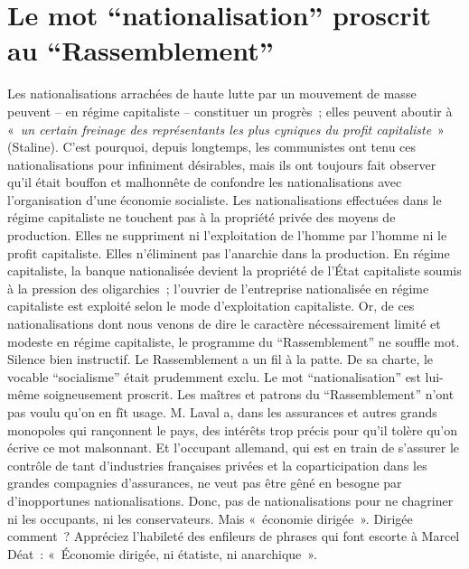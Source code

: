 \documentclass[french,twoside]{book} %
\begin{document}
\section[Le mot “nationalisation” proscrit au “Rassemblement”]{Le mot “nationalisation” proscrit au “Rassemblement”}
\noindent Les nationalisations arrachées de haute lutte par un mouvement de masse peuvent – en régime capitaliste – constituer un progrès ; elles peuvent aboutir à « \emph{un certain freinage des représentants les plus cyniques du profit capitaliste} » (Staline). C’est pourquoi, depuis longtemps, les communistes ont tenu ces nationalisations pour infiniment désirables, mais ils ont toujours fait observer qu’il était bouffon et malhonnête de confondre les nationalisations avec l’organisation d’une économie socialiste. Les nationalisations effectuées dans le régime capitaliste ne touchent pas à la propriété privée des moyens de production. Elles ne suppriment ni l’exploitation de l’homme par l’homme ni le profit capitaliste. Elles n’éliminent pas l’anarchie dans la production. En régime capitaliste, la banque nationalisée devient la propriété de l’État capitaliste soumis à la pression des oligarchies ; l’ouvrier de l’entreprise nationalisée en régime capitaliste est exploité selon le mode d’exploitation capitaliste. Or, de ces nationalisations dont nous venons de dire le caractère nécessairement limité et modeste en régime capitaliste, le programme du “Rassemblement” ne souffle mot. Silence bien instructif. Le Rassemblement a un fil à la patte. De sa charte, le vocable “socialisme” était prudemment exclu. Le mot “nationalisation” est lui-même soigneusement proscrit. Les maîtres et patrons du “Rassemblement” n’ont pas voulu qu’on en fît usage. M. Laval a, dans les assurances et autres grands monopoles qui rançonnent le pays, des intérêts trop précis pour qu’il tolère qu’on écrive ce mot malsonnant. Et l’occupant allemand, qui est en train de s’assurer le contrôle de tant d’industries françaises privées et la coparticipation dans les grandes compagnies d’assurances, ne veut pas être gêné en besogne par d’inopportunes nationalisations. Donc, pas de nationalisations pour ne chagriner ni les occupants, ni les conservateurs. Mais « économie dirigée ». Dirigée comment ? Appréciez l’habileté des enfileurs de phrases qui font escorte à Marcel Déat : « Économie dirigée, ni étatiste, ni anarchique ».
\end{document}
